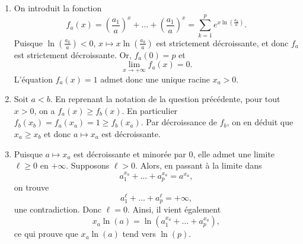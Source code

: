 \documentclass[a4paper, 11pt,openany]{book}%
\newtheorem[L]{thm}{Théorème}[section]
\newtheorem[M]{propo}[thm]{Proposition}
\newtheorem[M]{prop}[thm]{Propriété}
\newtheorem[M]{coro}[thm]{Corollaire}
\newtheorem[M]{lem}[thm]{Lemme}
\newtheorem[M,bodystyle=]{defi}[thm]{Définition}
\newtheorem[M,bodystyle=]{remark}[thm]{Remarque}
\newtheorem[M,bodystyle=]{met}[thm]{Méthode}
\newtheorem[M,bodystyle=]{ret}[thm]{A retenir}
\newtheorem[M,bodystyle=]{idee}[thm]{Idée}
\newtheorem[style=S,underline=false,bodystyle=]{exem}[thm]{Exemple}
\newtheorem[S,underline=false,bodystyle=]{exo}[thm]{Exercice}
\newtheorem[S,underline=false,bodystyle=]{appli}[thm]{Application}
\newtheorem[S,underline=false,bodystyle=]{sol}[thm]{Solution}
\newtheorem[S,underline=false,bodystyle=]{hypo}[thm]{Hypothesis}
\newtheorem[S,underline=false,bodystyle=]{nota}[thm]{Notation}
\begin{document}
\begin{sol}

\begin{enumerate}
\item On introduit la fonction 
\[ f_a(x)= \left( \frac{a_1}{a} \right)^x + \dots + \left( \frac{a_1}{a} \right)^x = \sum_{k=1}^p e^{x \ln \left( \frac{a_k}{a} \right)}.\]
Puisque $\ln \left( \frac{a_k}{a} \right)<0$, $x \mapsto x\ln \left( \frac{a_k}{a} \right)$ est strictement décroissante, et donc $f_a$ est strictement décroissante. Or, $f_a(0)=p$ et \[ \lim_{x\to + \infty} f_a(x) = 0.\]
L'équation $f_a(x)=1$ admet donc une unique racine $x_a>0$.
 \item Soit $a<b$. En reprenant la notation de la question précédente, pour tout $x>0$, on a $f_a(x) \geqslant f_b(x)$. En particulier $f_b(x_b)=f_a(x_a)=1 \geqslant f_b(x_a)$. Par décroissance de $f_b$, on en déduit que $x_a \geqslant x_b$ et donc $a \mapsto x_a$ est décroissante.
 \item Puisque $a\mapsto x_a$ est décroissante et minorée par $0$, elle admet une limite $\ell \geqslant 0$ en $+ \infty$. Supposons $\ell >0$. Alors, en passant à la limite dans 
 \[ a_1^{x_a} + \dots + a_p^{x_a}=a^{x_a},\]
 on trouve 
  \[ a_1^{\ell} + \dots + a_p^{\ell}=+ \infty,\]
une contradiction. Donc $\ell=0$. Ainsi, il vient également
\[ x_a \ln(a) = \ln \left(a_1^{x_a} + \dots + a_p^{x_a} \right),\]
ce qui prouve que $x_a \ln(a)$ tend vers $\ln(p)$. 
\end{enumerate}

\end{sol}
\end{document}
